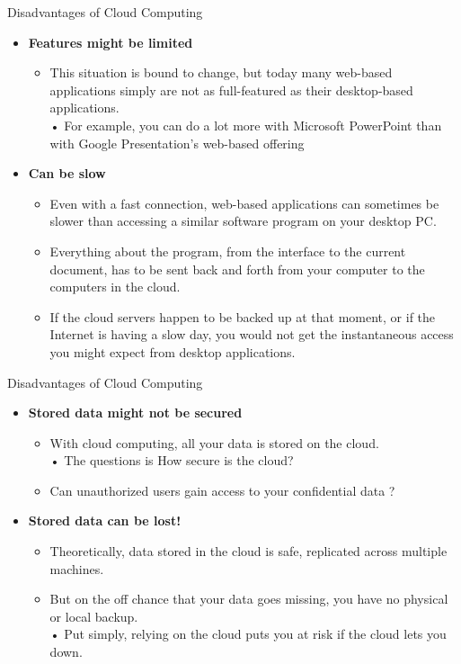\documentclass{SKP-beamer}
\begin{document}
\begin{frame}{Disadvantages of Cloud Computing}
	\begin{itemize}
		
		\item  \textbf{Features might be limited}
		\begin{itemize}
			\item  This situation is bound to change, but today many web-based applications simply 
			are not as full-featured as their desktop-based applications. \\
			• For example, you can do a lot more with Microsoft PowerPoint than with Google 
			Presentation's web-based offering
			
		\end{itemize}
		\item  \textbf{ Can be slow}
		\begin{itemize}
			\item Even with a fast connection, web-based applications can sometimes be slower than 
			accessing a similar software program on your desktop PC.
			\item  Everything about the program, from the interface to the current document, has to
			be sent back and forth from your computer to the computers in the cloud.
			\item  If the cloud servers happen to be backed up at that moment, or if the Internet is 
			having a slow day, you would not get the instantaneous access you might expect 
			from desktop applications.
			
		\end{itemize}
	\end{itemize}
\end{frame}


\begin{frame}{Disadvantages of Cloud Computing}
	\begin{itemize}
		
		\item  \textbf{Stored data might not be secured}
		\begin{itemize}
			\item  With cloud computing, all your data is stored on the cloud. \\
			• The questions is How secure is the cloud?
			\item  Can unauthorized users gain access to your confidential data ?
			
		\end{itemize}
		\item  \textbf{Stored data can be lost!}
		\begin{itemize}
			\item  Theoretically, data stored in the cloud is safe, replicated across multiple machines.
			\item  But on the off chance that your data goes missing, you have no physical or local backup. \\
			• Put simply, relying on the cloud puts you at risk if the cloud lets you down.
			
			
		\end{itemize}
	\end{itemize}
\end{frame}
\end{document}
